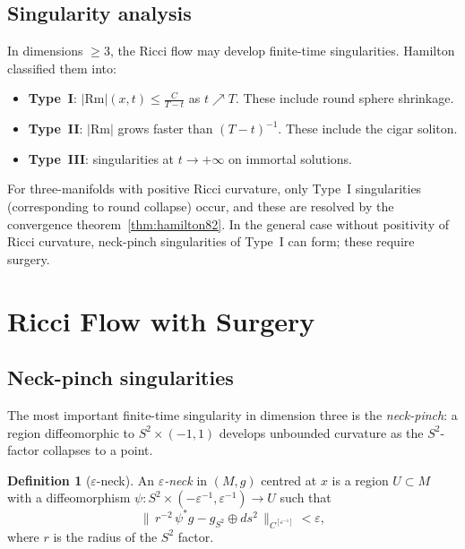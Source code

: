 \documentclass[12pt,a4paper]{amsart}
\theoremstyle{definition}
\newtheorem{definition}[theorem]{Definition}
\theoremstyle{remark}
\newcommand{\Rm}{\mathrm{Rm}}
\begin{document}
\subsection{Singularity analysis}

In dimensions $\geq 3$, the Ricci flow may develop finite-time singularities.
Hamilton classified them into:
\begin{itemize}
  \item \textbf{Type~I}: $|\Rm|(x,t) \leq \frac{C}{T-t}$ as $t \nearrow T$.
    These include round sphere shrinkage.
  \item \textbf{Type~II}: $|\Rm|$ grows faster than $(T-t)^{-1}$.
    These include the cigar soliton.
  \item \textbf{Type~III}: singularities at $t \to +\infty$ on immortal
    solutions.
\end{itemize}
For three-manifolds with positive Ricci curvature, only Type~I singularities
(corresponding to round collapse) occur, and these are resolved by the
convergence theorem~\ref{thm:hamilton82}.  In the general case without
positivity of Ricci curvature, neck-pinch singularities of Type~I can form;
these require surgery.


\section{Ricci Flow with Surgery}
\label{sec:surgery}

\subsection{Neck-pinch singularities}

The most important finite-time singularity in dimension three is the
\emph{neck-pinch}: a region diffeomorphic to $S^2 \times (-1,1)$ develops
unbounded curvature as the $S^2$-factor collapses to a point.

\begin{definition}[$\varepsilon$-neck]
An \emph{$\varepsilon$-neck} in $(M,g)$ centred at $x$ is a region
$U \subset M$ with a diffeomorphism $\psi: S^2 \times (-\varepsilon^{-1},
\varepsilon^{-1}) \to U$ such that
\[
  \bigl\|\, r^{-2}\,\psi^*g - g_{S^2} \oplus ds^2 \,\bigr\|_{C^{[\varepsilon^{-1}]}} < \varepsilon,
\]
where $r$ is the radius of the $S^2$ factor.
\end{definition}
\end{document}
